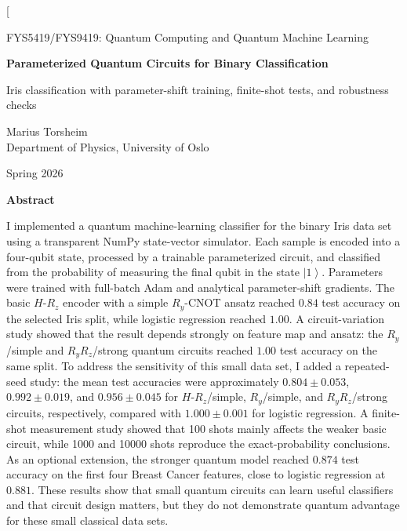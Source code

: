 \documentclass[10pt,a4paper]{article}
\newcommand{\ket}[1]{\left|#1\right\rangle}
\begin{document}
\twocolumn[
\begin{center}
{\large FYS5419/FYS9419: Quantum Computing and Quantum Machine Learning\par}
\vspace{0.25cm}
{\LARGE\bfseries Parameterized Quantum Circuits for Binary Classification\par}
\vspace{0.12cm}
{\large Iris classification with parameter-shift training, finite-shot tests, and robustness checks\par}
\vspace{0.35cm}
{Marius Torsheim\\Department of Physics, University of Oslo\par}
\vspace{0.15cm}
{Spring 2026\par}
\end{center}

\begin{center}
\textbf{Abstract}
\end{center}
\noindent I implemented a quantum machine-learning classifier for the binary Iris data set using a transparent NumPy state-vector simulator. Each sample is encoded into a four-qubit state, processed by a trainable parameterized circuit, and classified from the probability of measuring the final qubit in the state \(\ket{1}\). Parameters were trained with full-batch Adam and analytical parameter-shift gradients. The basic \(H\)-\(R_z\) encoder with a simple \(R_y\)-CNOT ansatz reached \(0.84\) test accuracy on the selected Iris split, while logistic regression reached \(1.00\). A circuit-variation study showed that the result depends strongly on feature map and ansatz: the \(R_y\)/simple and \(R_yR_z\)/strong quantum circuits reached \(1.00\) test accuracy on the same split. To address the sensitivity of this small data set, I added a repeated-seed study: the mean test accuracies were approximately \(0.804\pm0.053\), \(0.992\pm0.019\), and \(0.956\pm0.045\) for \(H\)-\(R_z\)/simple, \(R_y\)/simple, and \(R_yR_z\)/strong circuits, respectively, compared with \(1.000\pm0.001\) for logistic regression. A finite-shot measurement study showed that 100 shots mainly affects the weaker basic circuit, while 1000 and 10000 shots reproduce the exact-probability conclusions. As an optional extension, the stronger quantum model reached \(0.874\) test accuracy on the first four Breast Cancer features, close to logistic regression at \(0.881\). These results show that small quantum circuits can learn useful classifiers and that circuit design matters, but they do not demonstrate quantum advantage for these small classical data sets.
\end{document}
